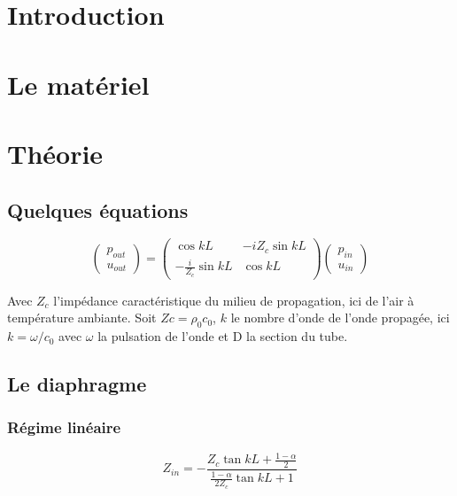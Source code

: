 \section*{Introduction}


\section{Le matériel}



\section{Théorie}
\subsection{Quelques équations}


\begin{equation*}
    \begin{pmatrix}
        p_{out}\\
        u_{out}
    \end{pmatrix}
    =
    \begin{pmatrix}
        \cos{kL} & -iZ_c\sin{kL}\\
        -\frac{i}{Z_c}\sin{kL} & \cos{kL}
    \end{pmatrix}
    \begin{pmatrix}
        p_{in}\\
        u_{in}
    \end{pmatrix}
\end{equation*}

Avec $Z_c$ l'impédance caractéristique du milieu de propagation, ici de l'air à température ambiante. Soit $Zc=\rho_0 c_0$, $k$ le nombre d'onde de l'onde propagée, ici $k=\omega/c_0$ avec $\omega$ la pulsation de l'onde et D la section du tube. 



\subsection{Le diaphragme}

\subsubsection{Régime linéaire}

\begin{equation*}
    Z_{in}=-\frac{Z_c\tan kL + \frac{1-\alpha}{2}}{\frac{1-\alpha}{2Z_c}\tan kL+1}
\end{equation*}

